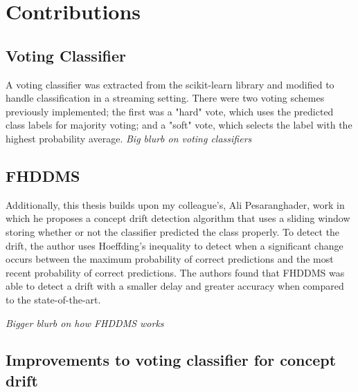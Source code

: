 \chapter{Contributions} %

\label{Chapter3} %


\section{Voting Classifier}
A voting classifier was extracted from the scikit-learn library and modified to handle classification in a streaming setting. There were two voting schemes previously implemented; the first was a "hard" vote, which uses the predicted class labels for majority voting; and a "soft" vote, which selects the label with the highest probability average. 
\textit{Big blurb on voting classifiers}


\section{FHDDMS}

Additionally, this thesis builds upon my colleague's, Ali Pesaranghader, work \parencite{pesaranghader2016fast} in which he proposes a concept drift detection algorithm that uses a sliding window storing whether or not the classifier predicted the class properly. To detect the drift, the author uses Hoeffding's inequality to detect when a significant change occurs between the maximum probability of correct predictions and the most recent probability of correct predictions. The authors found that FHDDMS was able to detect a drift with a smaller delay and greater accuracy when compared to the state-of-the-art.

\textit{Bigger blurb on how FHDDMS works}


\section{Improvements to voting classifier for concept drift}

